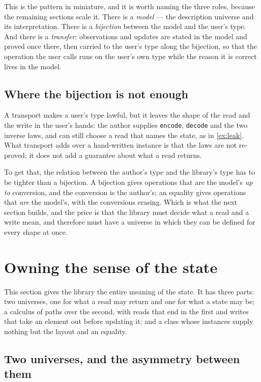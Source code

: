 \documentclass[11pt,a4paper]{article}
\theoremstyle{definition}
\theoremstyle{plain}
\newcommand{\code}[1]{\texttt{#1}}
\begin{document}
This is the pattern in miniature, and it is worth naming the three roles, because
the remaining sections scale it. There is a \emph{model} --- the description
universe and its interpretation. There is a \emph{bijection} between the model
and the user's type. And there is a \emph{transfer}: observations and updates are
stated in the model and proved once there, then carried to the user's type along
the bijection, so that the operation the user calls runs on the user's own type
while the reason it is correct lives in the model.

\subsection{Where the bijection is not enough}

A transport makes a user's type lawful, but it leaves the shape of the read and
the write in the user's hands: the author supplies \code{encode}, \code{decode}
and the two inverse laws, and can still choose a read that names the state, as in
\cref{ex:leak}. What transport adds over a hand-written instance is that the laws
are not re-proved; it does not add a guarantee about what a read returns.

To get that, the relation between the author's type and the library's type has to
be tighter than a bijection. A bijection gives operations that are the model's
\emph{up to} conversion, and the conversion is the author's; an equality gives
operations that \emph{are} the model's, with the conversions erasing. Which is
what the next section builds, and the price is that the library must decide what
a read and a write mean, and therefore must have a universe in which they can be
defined for every shape at once.

\section{Owning the sense of the state}\label{sec:sealed}

This section gives the library the entire meaning of the state. It has three
parts: two universes, one for what a read may return and one for what a state
may be; a calculus of paths over the second, with reads that end in the first and
writes that take an element out before updating it; and a class whose instances
supply nothing but the layout and an equality.

\subsection{Two universes, and the asymmetry between them}
\end{document}
